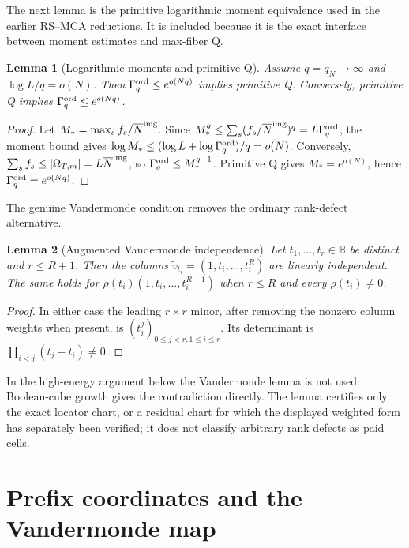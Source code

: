 \documentclass[12pt,a4paper]{amsart}
\numberwithin{equation}{section}
\newtheorem{lemma}[lemma]{Lemma}
\theoremstyle{remark}
\newcommand{\B}{\mathbb B}
\newcommand{\Gord}{\Gamma^{\rm ord}}
\newcommand{\barN}{\overline N}
\newcommand{\abs}[1]{\lvert #1\rvert}
\begin{document}
The next lemma is the primitive logarithmic moment equivalence used in the earlier RS--MCA reductions.  It is included because it is the exact interface between moment estimates and max-fiber Q.

\begin{lemma}[Logarithmic moments and primitive Q]\label{lem:logmoment-q}
Assume \(q=q_N\to\infty\) and \(\log L/q=o(N)\).  Then
\(\Gord_q\le e^{o(Nq)}\) implies primitive Q.  Conversely, primitive Q
implies \(\Gord_q\le e^{o(Nq)}\).
\end{lemma}

\begin{proof}
Let \(M_*=\max_s f_s/\barN^{\rm img}\).  Since
\(M_*^q\le\sum_s(f_s/\barN^{\rm img})^q=L\Gord_q\), the moment bound gives
\(\log M_*\le(\log L+\log\Gord_q)/q=o(N)\).  Conversely,
\(\sum_sf_s\le\abs{\Omega_{T,m}}=L\barN^{\rm img}\), so
\(\Gord_q\le M_*^{q-1}\).  Primitive Q gives \(M_*=e^{o(N)}\), hence
\(\Gord_q=e^{o(Nq)}\).
\end{proof}

The genuine Vandermonde condition removes the ordinary rank-defect alternative.

\begin{lemma}[Augmented Vandermonde independence]\label{lem:vandermonde}
Let \(t_1,\ldots,t_r\in\B\) be distinct and \(r\le R+1\).  Then the
columns \(\widetilde v_{t_i}=(1,t_i,\ldots,t_i^R)\) are linearly
independent.  The same holds for \(\rho(t_i)(1,t_i,\ldots,t_i^{R-1})\)
when \(r\le R\) and every \(\rho(t_i)\ne0\).
\end{lemma}

\begin{proof}
In either case the leading \(r\times r\) minor, after removing the nonzero
column weights when present, is \((t_i^j)_{0\le j<r,1\le i\le r}\).  Its
determinant is \(\prod_{i<j}(t_j-t_i)\ne0\).
\end{proof}

In the high-energy argument below the Vandermonde lemma is not used:
Boolean-cube growth gives the contradiction directly.  The lemma certifies
only the exact locator chart, or a residual chart for which the displayed
weighted form has separately been verified; it does not classify arbitrary
rank defects as paid cells.


\section{Prefix coordinates and the Vandermonde map}\label{sec:prefix-coordinates}
\end{document}
